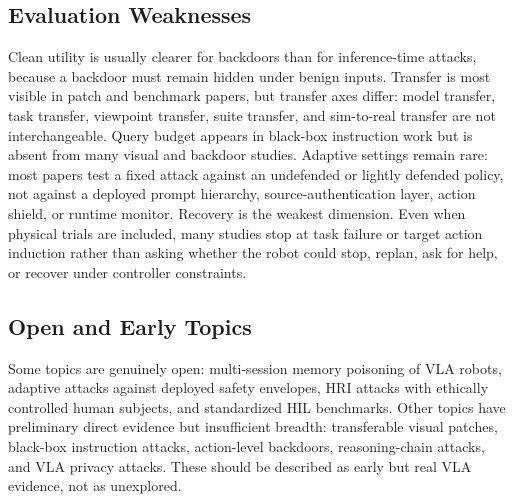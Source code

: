 \subsection{Evaluation Weaknesses}

Clean utility is usually clearer for backdoors than for inference-time attacks, because a backdoor must remain hidden under benign inputs. Transfer is most visible in patch and benchmark papers, but transfer axes differ: model transfer, task transfer, viewpoint transfer, suite transfer, and sim-to-real transfer are not interchangeable. Query budget appears in black-box instruction work but is absent from many visual and backdoor studies. Adaptive settings remain rare: most papers test a fixed attack against an undefended or lightly defended policy, not against a deployed prompt hierarchy, source-authentication layer, action shield, or runtime monitor. Recovery is the weakest dimension. Even when physical trials are included, many studies stop at task failure or target action induction rather than asking whether the robot could stop, replan, ask for help, or recover under controller constraints.

\subsection{Open and Early Topics}

Some topics are genuinely open: multi-session memory poisoning of VLA robots, adaptive attacks against deployed safety envelopes, HRI attacks with ethically controlled human subjects, and standardized HIL benchmarks. Other topics have preliminary direct evidence but insufficient breadth: transferable visual patches, black-box instruction attacks, action-level backdoors, reasoning-chain attacks, and VLA privacy attacks. These should be described as early but real VLA evidence, not as unexplored.
